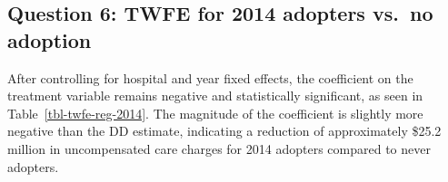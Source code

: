 \documentclass[
  letterpaper,
  DIV=11,
  numbers=noendperiod]{scrartcl}
\begin{document}
\begin{table}[H]

\caption{\label{tbl-dd-reg-2014}Difference-in-Differences Regression
Results for 2014 Adopters vs.~Never Adopters}


\end{table}%

\subsection{Question 6: TWFE for 2014 adopters vs.~no
adoption}\label{question-6-twfe-for-2014-adopters-vs.-no-adoption}

After controlling for hospital and year fixed effects, the coefficient
on the treatment variable remains negative and statistically
significant, as seen in Table~\ref{tbl-twfe-reg-2014}. The magnitude of
the coefficient is slightly more negative than the DD estimate,
indicating a reduction of approximately \$25.2 million in uncompensated
care charges for 2014 adopters compared to never adopters.
\end{document}
